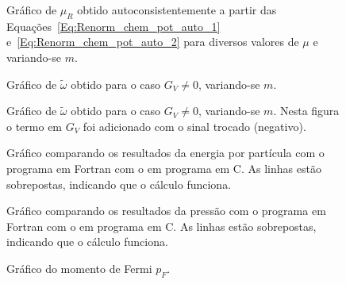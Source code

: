 \begin{figure}
	
	\caption{Gráfico de $\mu_R$ obtido autoconsistentemente a partir das Equações~\eqref{Eq:Renorm_chem_pot_auto_1} e~\eqref{Eq:Renorm_chem_pot_auto_2} para diversos valores de $\mu$ e variando-se $m$. \protect}
	\label{Fig:Renorm_chem_pot}
\end{figure}

\begin{figure}
	
	\caption{Gráfico de $\tilde\omega$ obtido para o caso $G_V \neq 0$, variando-se $m$. \protect}
	\label{Fig:Fig2.8RBubR_repro}
\end{figure}

\begin{figure}
	
	\caption{Gráfico de $\tilde\omega$ obtido para o caso $G_V \neq 0$, variando-se $m$. Nesta figura o termo em $G_V$ foi adicionado com o sinal trocado (negativo). \protect}
	\label{Fig:Fig2.8RBubR_repro_s}
\end{figure}

\begin{figure}
	
	\caption{Gráfico comparando os resultados da energia por partícula com o programa em Fortran com o em programa em C. As linhas estão sobrepostas, indicando que o cálculo funciona. \protect}
	\label{Fig:energy_Comp_C_F}
\end{figure}

\begin{figure}
	
	\caption{Gráfico comparando os resultados da pressão com o programa em Fortran com o em programa em C. As linhas estão sobrepostas, indicando que o cálculo funciona. \protect}
	\label{Fig:pressure_Comp_C_F}
\end{figure}

\FloatBarrier


\begin{figure}
	
	\caption{Gráfico do momento de Fermi $p_F$. \protect}
	\label{Fig:fermi_momentum_NJL-Buballa_Set_1}
\end{figure}


